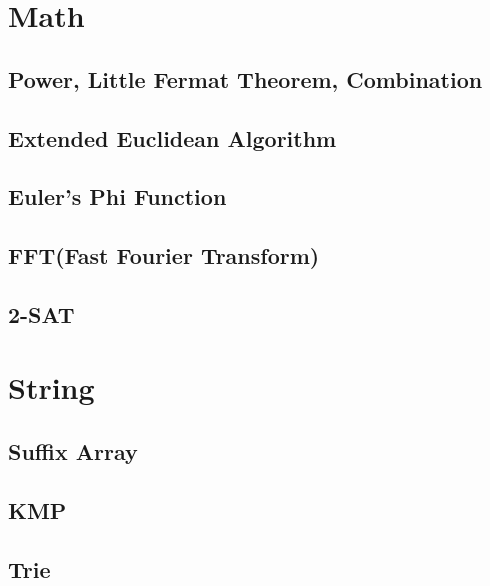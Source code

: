 \documentclass[10pt, a4paper]{article}
\begin{document}
\tableofcontents



\section{Math}

\subsection{Power, Little Fermat Theorem, Combination}


\subsection{Extended Euclidean Algorithm}


\subsection{Euler's Phi Function}


\subsection{FFT(Fast Fourier Transform)}


\subsection{2-SAT}




\section{String}

\subsection{Suffix Array}


\subsection{KMP}


\subsection{Trie}

\end{document}
